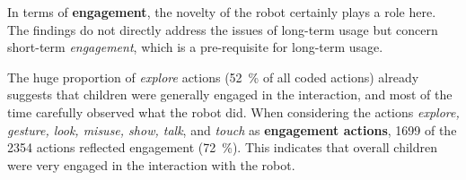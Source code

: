\documentclass{sig-alternate}
\begin{document}


In terms of \textbf{engagement}, the novelty of the robot certainly plays a role
here. The findings do not directly address the issues
of long-term usage but concern short-term \textit{engagement}, which is a
pre-requisite for long-term usage.


The huge proportion of \textit{explore} actions (52~\% of all coded actions)
already suggests that children were generally engaged in the interaction, and
most of the time carefully observed what the robot did. When considering the
actions \textit{explore, gesture, look, misuse, show, talk}, and \textit{touch}
as \textbf{engagement actions}, 1699 of the 2354 actions reflected engagement
(72~\%). This indicates that overall children were very engaged in the
interaction with the robot.
\end{document}
